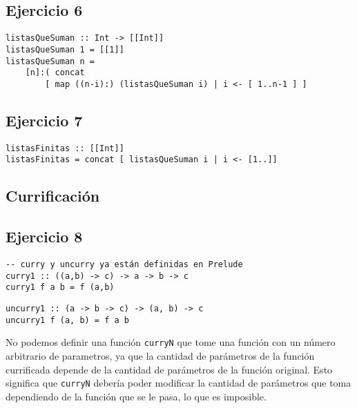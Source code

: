 \subsection{Ejercicio 6}
\begin{centrado}
\begin{verbatim}
listasQueSuman :: Int -> [[Int]]
listasQueSuman 1 = [[1]]
listasQueSuman n = 
    [n]:( concat 
	    [ map ((n-i):) (listasQueSuman i) | i <- [ 1..n-1 ] ] 
\end{verbatim}
\end{centrado}

\subsection{Ejercicio 7}

\begin{centrado}
	\begin{verbatim}
listasFinitas :: [[Int]]
listasFinitas = concat [ listasQueSuman i | i <- [1..]]
\end{verbatim}
\end{centrado}	

\subsection*{Currificación}
\subsection{Ejercicio 8}

\begin{centrado}
	\begin{verbatim}
-- curry y uncurry ya están definidas en Prelude
curry1 :: ((a,b) -> c) -> a -> b -> c
curry1 f a b = f (a,b)
	\end{verbatim}
\end{centrado}

\begin{centrado}
\begin{verbatim}
uncurry1 :: (a -> b -> c) -> (a, b) -> c
uncurry1 f (a, b) = f a b
	\end{verbatim}
\end{centrado}

No podemos definir una función \texttt{curryN} que tome una función con un número arbitrario de parametros, ya que la cantidad de parámetros de la función currificada depende de la cantidad de parámetros de la función original. Esto significa que \texttt{curryN} debería poder modificar la cantidad de parámetros que toma dependiendo de la función que se le pasa, lo que es imposible.

